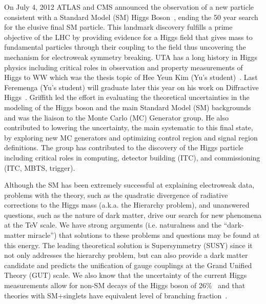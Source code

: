 On July 4, 2012 ATLAS and CMS announced the observation of a new
particle consistent with a Standard Model (SM) Higgs
Boson~\cite{ATLAS-Higgs-Observation, CMS-Higgs-Observation}, ending
the 50 year search for the elusive final SM particle. This landmark
discovery fulfills a prime objective of the LHC by providing evidence
for a Higgs field that gives mass to fundamental particles through
their coupling to the field thus uncovering the mechanism for
electroweak symmetry breaking.  UTA has a long history in Higgs
physics including critical roles in observation and property
measurements of Higgs to WW which was the thesis topic of Hee Yeun Kim
(Yu's student)~\cite{WW_observation,WW_highmass}.  Last Feremenga (Yu's student) will graduate later
this year on his work on Diffractive Higgs~\cite{WW_fiducial}.  Griffith led the effort
in evaluating the theoretical uncertainties in the modeling of the
Higgs boson and the main Standard Model (SM) backgrounds and was the
liaison to the Monte Carlo (MC) Generator group. He also contributed
to lowering the uncertainty, the main systematic to this final state,
by exploring new MC generators and optimizing control region and
signal region definitions.  The group has contributed to the discovery
of the Higgs particle including critical roles in computing, detector
building (ITC), and commissioning (ITC, MBTS, trigger).

Although the SM has been extremely successful at explaining electroweak data, problems with the theory, such as the quadratic divergence of radiative corrections to the Higgs mass (a.k.a. the Hierarchy problem), and unanswered questions, such as the nature of dark matter, drive our search for new phenomena at the TeV scale. We have strong arguments (i.e. naturalness and the ``dark-matter miracle'') 
that solutions to these problems and questions may be found at this energy. 
The leading theoretical solution is Supersymmetry (SUSY) since it not only addresses the hierarchy problem, but can also provide a dark matter candidate and predicts the unification of gauge couplings at the Grand Unified Theory (GUT) scale.
We also know that the uncertainty of the current Higgs measurements allow for non-SM decays of the Higgs boson of 26\%~\cite{combin} and that theories with SM+singlets have equivalent level of branching fraction~\cite{exohiggs}.

